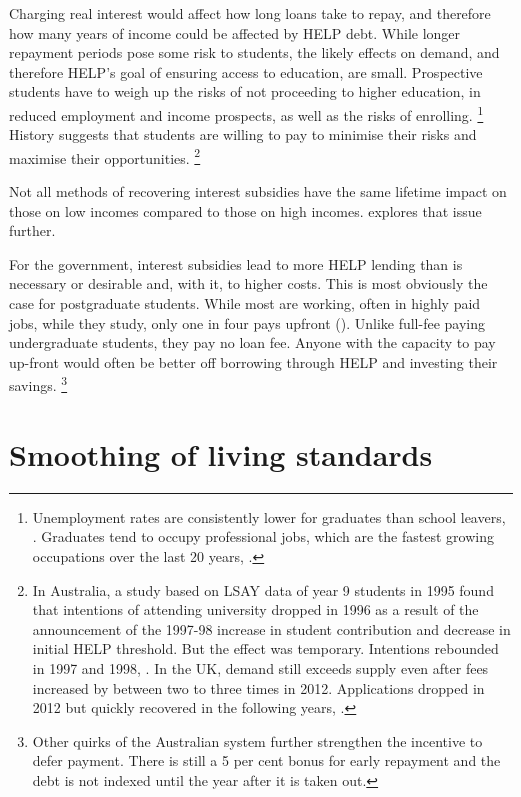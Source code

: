 \documentclass[embargoed]{grattan}
\begin{document}
Charging real interest would affect how long loans take to repay, and therefore how many years of income could be affected by \gls{HELP} debt.
While longer repayment periods pose some risk to students, the likely effects on demand, and therefore \gls{HELP}'s goal of ensuring access to education, are small.
Prospective students have to weigh up the risks of not proceeding to higher education, in reduced employment and income prospects, as well as the risks of enrolling.%
\footnote{Unemployment rates are consistently lower for graduates than school leavers, \textcite[][table 10]{Norton2016MappingAustralianhigher}.
Graduates tend to occupy professional jobs, which are the fastest growing occupations over the last 20 years, \textcite{ABS2015LabourforceAustralia}.} History suggests that students are willing to pay to minimise their risks and maximise their opportunities.%
\footnote{In Australia, a study based on LSAY data of year 9 students in 1995 found that intentions of attending university dropped in 1996 as a result of the announcement of the 1997-98 increase in student contribution and decrease in initial \gls{HELP} threshold.
But the effect was temporary.
Intentions rebounded in 1997 and 1998, \textcite[][p. 505]{Chapman2005accessimplicationsincome}.
In the UK, demand still exceeds supply even after fees increased by between two to three times in 2012.
Applications dropped in 2012 but quickly recovered in the following years, \textcite[][figure 4 and figure 27]{UCAS20152015endcycle}.}

Not all methods of recovering interest subsidies have the same lifetime impact on those on low incomes compared to those on high incomes.
 explores that issue further.

For the government, interest subsidies lead to more \gls{HELP} lending than is necessary or desirable and, with it, to higher costs.
This is most obviously the case for postgraduate students.
While most are working, often in highly paid jobs, while they study, only one in four pays upfront ().
Unlike full-fee paying undergraduate students, they pay no loan fee.
Anyone with the capacity to pay up-front would often be better off borrowing through \gls{HELP} and investing their savings.%
\footnote{Other quirks of the Australian system further strengthen the incentive to defer payment.
There is still a 5 per cent bonus for early repayment and the debt is not indexed until the year after it is taken out.}

\section{Smoothing of living standards}\label{smoothing-of-living-standards}
\end{document}
